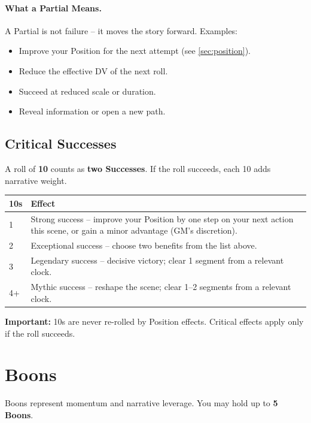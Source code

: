 \paragraph{What a Partial Means.}
A Partial is not failure – it moves the story forward. Examples:
\begin{itemize}
  \item Improve your Position for the next attempt (see \ref{sec:position}).
  \item Reduce the effective DV of the next roll.
  \item Succeed at reduced scale or duration.
  \item Reveal information or open a new path.
\end{itemize}

\subsection{Critical Successes}
\label{sec:critical-success}

A roll of \textbf{10} counts as \textbf{two Successes}. If the roll succeeds, each 10 adds narrative weight.

\begin{center}
\begin{tabular}{ll}
\toprule
\textbf{10s} & \textbf{Effect} \\
\midrule
1 & Strong success – improve your Position by one step on your next action this scene, or gain a minor advantage (GM’s discretion). \\
2 & Exceptional success – choose two benefits from the list above. \\
3 & Legendary success – decisive victory; clear 1 segment from a relevant clock. \\
4+ & Mythic success – reshape the scene; clear 1–2 segments from a relevant clock. \\
\bottomrule
\end{tabular}
\end{center}

\noindent \textbf{Important:} 10s are never re-rolled by Position effects. Critical effects apply only if the roll succeeds.

\section{Boons}
\label{sec:boons}

Boons represent momentum and narrative leverage. You may hold up to \textbf{5 Boons}.

